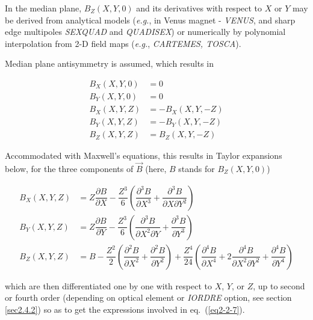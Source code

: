 In the median plane, $ B_Z(X,Y,0)$ and its 
derivatives with respect to $ X $ or $ Y$ may be derived  from analytical
models (\emph{e.g.}, in Venus magnet - \textsl{VENUS}, and sharp edge 
multipoles  \textsl{SEXQUAD}   and \textsl{QUADISEX}) or numerically by
polynomial interpolation from 2-D field maps (\emph{e.g.}, \textsl{CARTEMES, 
TOSCA}).  


\noindent Median plane antisymmetry is assumed, which results in 


\begin{equation}
	\begin{aligned}
		B_X(X,Y,0)  &  =   0 \\
		B_Y(X,Y,0) & =  0 \\
		B_X(X,Y,Z)  & =  -B_X(X,Y,-Z) \\
		B_Y(X,Y,Z)  &  =  -B_Y(X,Y,-Z) \\
		B_Z(X,Y,Z) & =   B_Z(X,Y,-Z) 
	\end{aligned}
	\label{eq2-3-2}
\end{equation}

\noindent Accommodated with Maxwell's equations, this results 
 in  Taylor expansions below,  for the three components of $ \vec  B $ (here, 
$ B $ stands for $ B_Z(X,Y,0)$) 

\begin{equation}
	\begin{aligned}
		B_X(X,Y,Z) 
		      & =   Z \dfrac{\partial B }{ \partial X} - \dfrac{Z^3 }{ 6} 
		        \left(  \dfrac{\partial^ 3B }{\partial X^3} 
		           + \dfrac{\partial^ 3B }{ \partial X\partial Y^2} \right) \\
		B_Y(X,Y,Z)
		      & =  Z \dfrac{\partial B }{ \partial Y} - \dfrac{Z^3}{ 6} 
		        \left(\dfrac{\partial^ 3B }{\partial X^2\partial Y} 
		           + \dfrac{\partial^ 3B}{ \partial Y^3} \right) \\
		B_Z(X,Y,Z) 
		      & =  B - \dfrac{Z^2 }{ 2} 
		        \left(  \dfrac{\partial^ 2B }{ \partial X^2} 
		           + \dfrac{\partial^ 2B}{\partial Y^2} \right) 
		        + \dfrac{Z^4 }{ 24} 
		        \left( \dfrac{\partial^ 4B }{\partial X^4} 
		           + 2 \dfrac{\partial^ 4B }{ \partial X^2\partial Y^2} 
		           + \dfrac{\partial^4B }{ \partial Y^4} \right)
	\end{aligned}
	\label{eq2-3-3}
\end{equation}

\noindent  which are then differentiated one by one with respect to $ X$, $Y$, 
or $ Z$, up to second or fourth order (depending on optical element or 
\textsl{IORDRE} option, see section \ref{sec2.4.2}) so as to get the expressions
 involved in eq.~(\ref{eq2-2-7}). 
 


